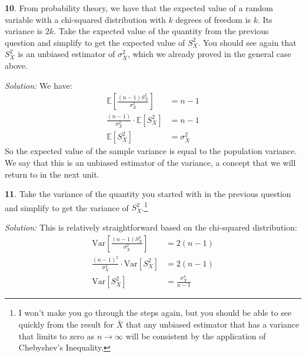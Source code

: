 \documentclass{tufte-handout}
\newcommand{\E}{\mathbb{E}}
\newcommand{\V}{\text{Var}}
\begin{document}
\textbf{10}. From probability theory, we have that the expected value of a random variable with
a chi-squared distribution with $k$ degrees of freedom is $k$. Its variance is $2k$.
Take the expected value of the quantity from the previous question and
simplify to get the expected value of $S_X^2$. You should see again that $S_X^2$ is
an unbiased estimator of $\sigma_X^2$, which we already proved in the general case
above.

\textit{Solution:} We have:
\begin{align*}
\E \left[ \frac{(n-1) S_X^2}{\sigma_X^2} \right] &= n-1 \\
\frac{(n-1)}{\sigma_X^2} \cdot \E \left[ S_X^2 \right] &= n-1 \\
\E \left[ S_X^2 \right] &= \sigma_X^2
\end{align*}
So the expected value of the sample variance is equal to the population variance.
We say that this is an unbiased estimator of the variance, a concept that we will
return to in the next unit.

\textbf{11}. Take the variance of the quantity you started with in the previous question and
simplify to get the variance of $S_X^2$.\footnote{
  I won't make you go through the steps again, but you should be able to see
  quickly from the result for $\bar{X}$ that any unbiased estimator that has
  a variance that limits to zero as $n\rightarrow\infty$ will be consistent
  by the application of Chebyshev's Inequality.
}

\textit{Solution:} This is relatively straightforward based on the chi-squared distribution:
\begin{align*}
\V \left[ \frac{(n-1) S_X^2}{\sigma_X^2} \right] &= 2(n-1) \\
\frac{(n-1)^2}{\sigma_X^4} \cdot \V \left[ S_X^2 \right] &= 2(n-1) \\
\V \left[ S_X^2 \right] &= \frac{\sigma_X^4}{n-1}
\end{align*}
\end{document}
